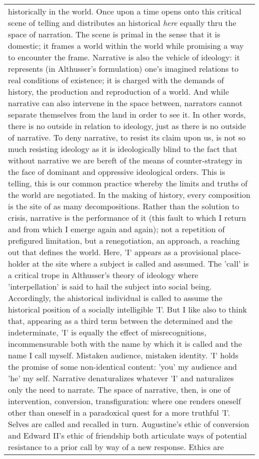 \begin{longtable}[]{@{}l@{}}
\begin{minipage}[t]{0.97\columnwidth}
historically in the world. Once upon a time opens onto this critical
scene of telling and distributes an historical \emph{here} equally thru
the space of narration. The scene is primal in the sense that it is
domestic; it frames a world within the world while promising a way to
encounter the frame. Narrative is also the vehicle of ideology: it
represents (in Althusser's formulation) one's imagined relations to real
conditions of existence; it is charged with the demands of history, the
production and reproduction of a world. And while narrative can also
intervene in the space between, narrators cannot separate themselves
from the land in order to see it. In other words, there is no outside in
relation to ideology, just as there is no outside of narrative. To deny
narrative, to resist its claim upon us, is not so much resisting
ideology as it is ideologically blind to the fact that without narrative
we are bereft of the means of counter-strategy in the face of dominant
and oppressive ideological orders. This is telling, this is our common
practice whereby the limits and truths of the world are negotiated. In
the making of history, every composition is the site of as many
decompositions. Rather than the solution to crisis, narrative is the
performance of it (this fault to which I return and from which I emerge
again and again); not a repetition of prefigured limitation, but a
renegotiation, an approach, a reaching out that defines the world. Here,
'I' appears as a provisional place-holder at the site where a subject is
called and assumed. The 'call' is a critical trope in Althusser's theory
of ideology where 'interpellation' is said to hail the subject into
social being. Accordingly, the ahistorical individual is called to
assume the historical position of a socially intelligible 'I'. But I
like also to think that, appearing as a third term between the
determined and the indeterminate, 'I' is equally the effect of
misrecognitions, incommensurable both with the name by which it is
called and the name I call myself. Mistaken audience, mistaken identity.
'I' holds the promise of some non-identical content: 'you' my audience
and 'he' my self. Narrative denaturalizes whatever 'I' and naturalizes
only the need to narrate. The space of narrative, then, is one of
intervention, conversion, transfiguration: where one renders oneself
other than oneself in a paradoxical quest for a more truthful 'I'.
Selves are called and recalled in turn. Augustine's ethic of conversion
and Edward II's ethic of friendship both articulate ways of potential
resistance to a prior call by way of a new response. Ethics are

\end{minipage}
\end{longtable}
